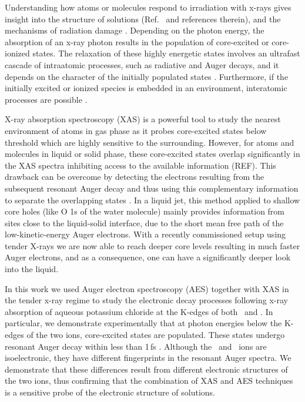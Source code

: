 Understanding how atoms or molecules respond to irradiation with x-rays gives insight into the structure of solutions (Ref.\ \citep{smith17:13909} and references therein), and the mechanisms of radiation damage \citep{ONeill02:329,Carugo05:213,Stumpf16:237}. Depending on the photon energy, the absorption of an x-ray photon results in the population of core-excited or core-ionized states. The relaxation of these highly energetic states involves an ultrafast cascade of intraatomic processes, such as radiative and Auger decays, and it depends on the character of the initially populated states \citep{stoychev08:074307,Demekhin08:043421,Demekhin09:104303,Ouchi11:053415,Miteva14:164303,travnikova16:213001,Gokhberg14:661,Trinter14:664}. Furthermore, if the initially excited or ionized species is embedded in an environment, interatomic processes are possible  \citep{Pokapanich09:7264,Pokapanich11:13430,Stumpf16:237,unger17:708,ceolin17:263003}.


X-ray absorption spectroscopy (XAS) is a powerful tool to study the nearest environment of atoms in gas phase as it probes core-excited states below threshold which are highly sensitive to the surrounding. However, for atoms and molecules in liquid or solid phase, these core-excited states overlap significantly in the XAS spectra inhibiting access to the available information {\color{red}(REF)}. This drawback can be overcome by detecting the electrons resulting from the subsequent resonant Auger decay and thus using this complementary information to separate the overlapping states \citep{goldsz16:15133}. In a liquid jet, this method applied to shallow core holes (like O 1s of the water molecule) mainly provides information from sites close to the liquid-solid interface, due to the short mean free path of the low-kinetic-energy Auger electrons. With a recently commissioned setup using tender X-rays \citep{ceolin13:188,rueff15:175} we are now able to reach deeper core levels resulting in much faster Auger electrons, and as a consequence, one can have a significantly deeper look into the liquid. 


In this work we used Auger electron spectroscopy (AES) together with XAS in the tender x-ray regime to study the electronic decay processes following x-ray absorption of aqueous potassium chloride at the K-edges of both \ki~and \cli. In particular, we demonstrate experimentally that at photon energies below the K-edges of the two ions, core-excited states are populated. These states undergo resonant Auger decay within less than 1\,fs \citep{ceolin17:263003}. Although the \ki~and \cli~ions are isoelectronic, they have different fingerprints in the resonant Auger spectra. We demonstrate that these differences result from different electronic structures of the two ions, thus confirming that the combination of XAS and AES techniques is a sensitive probe of the electronic structure of solutions.


